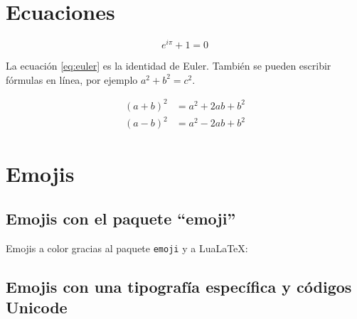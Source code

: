 \section{Ecuaciones}

\begin{equation}
    \label{eq:euler}
    e^{i\pi} + 1 = 0
\end{equation}

La ecuación \ref{eq:euler} es la identidad de Euler. También se pueden escribir
fórmulas en línea, por ejemplo $a^2 + b^2 = c^2$.

\begin{align}
  (a+b)^2 &= a^2 + 2ab + b^2 \\
  (a-b)^2 &= a^2 - 2ab + b^2
\end{align}



\section{Emojis}


\subsection{Emojis con el paquete ``emoji''}

Emojis a color gracias al paquete \texttt{emoji} y a LuaLaTeX:


\subsection{Emojis con una tipografía específica y códigos Unicode}

%
%
%
%



